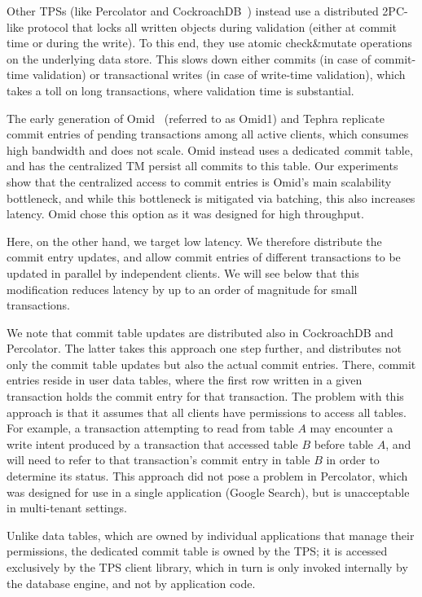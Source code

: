Other TPSs (like Percolator and  CockroachDB~\cite{cockroach}) instead use a distributed 2PC-like protocol that locks all written objects during validation (either at commit time or during the write). To this end, they use atomic check\&mutate operations on the underlying data store. This slows down either commits (in case of commit-time validation) or transactional writes (in case of write-time validation), which takes a toll on long transactions, where validation time is substantial. 

%
The early generation of Omid~\cite{OmidICDE2014} (referred to as Omid1) and Tephra replicate commit entries 
of pending transactions among all active clients, which consumes high bandwidth and does not scale. Omid 
instead uses a dedicated {\emph commit table}, and 
has the centralized TM persist all commits to this table. 
Our experiments show that the centralized access to commit entries is Omid's main scalability bottleneck, 
and while this bottleneck is mitigated via batching, this also increases latency.
Omid chose this  option as it was designed for high throughput. 

Here, on the other hand, we target  low latency. 
We therefore distribute the commit entry updates, and allow commit entries of different transactions to be 
updated in parallel by independent clients. We will see below that this modification reduces latency
by up to an order of magnitude for small transactions.

We note that commit table updates are distributed also in CockroachDB and Percolator. 
The latter takes this approach one step further, and distributes not only the commit table updates 
but also the actual commit entries. There, commit entries reside in user data tables, 
where the first row written in a given transaction holds the commit entry for that transaction.
The problem with this approach is that it assumes that all clients have permissions to access all 
tables. For example, a transaction attempting to read from  table $A$ may encounter a write intent 
produced by a transaction that accessed table $B$ before table $A$, and will need to refer to 
that transaction's commit entry in table $B$ in order to determine its status. This approach 
did not pose a problem in Percolator, which was designed for use in a single application (Google Search), 
but is unacceptable in multi-tenant settings.   

Unlike data tables, which are owned by individual applications that manage their permissions,  
the dedicated commit table is owned by the TPS; it is accessed exclusively by the 
TPS client library, which in turn is only invoked   internally by the database engine, and not by application code. 

{}


